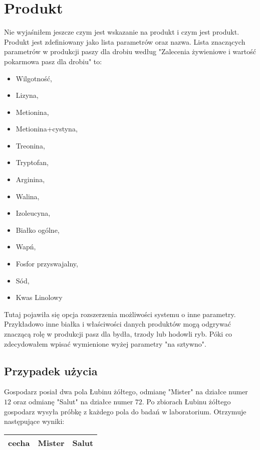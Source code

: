 \documentclass[shortabstract]{iithesis}
\begin{document}
\section{Produkt}
Nie wyjaśniłem jeszcze czym jest wskazanie na produkt i czym jest produkt. Produkt jest zdefiniowany jako lista parametrów oraz nazwa.
Lista znaczących parametrów w produkcji paszy dla drobiu według "Zalecenia żywieniowe i wartość pokarmowa pasz dla drobiu" to:
\begin{itemize}
	\item 	Wilgotność,
	\item	Lizyna, 
	\item	Metionina,
	\item 	Metionina+cystyna, 
	\item	Treonina, 
	\item	Tryptofan, 
	\item	Arginina, 
	\item	Walina, 
	\item	Izoleucyna, 
	\item	Białko ogólne, 
	\item	Wapń, 
    	\item 	Fosfor przyswajalny, 
    	\item	Sód, 
    	\item	Kwas Linolowy 
\end{itemize}

Tutaj pojawiła się opcja rozszerzenia możliwości systemu o inne parametry. Przykładowo inne białka i właściwości danych produktów mogą odgrywać znaczącą rolę w produkcji pasz dla bydła, trzody lub hodowli ryb. Póki co zdecydowałem wpisać wymienione wyżej parametry "na sztywno".

\subsection{Przypadek użycia}
Gospodarz posiał dwa pola Łubinu żółtego, odmianę "Mister" na działce numer $12$ oraz odmianę "Salut" na działce numer $72$. Po zbiorach Łubinu żółtego gospodarz wysyła próbkę z każdego pola do badań w laboratorium. Otrzymuje następujące wyniki:

\begin{tabular}{|c|c|c|}
\hline
cecha &Mister &Salut \\
\hline
\end{tabular}






\end{document}
